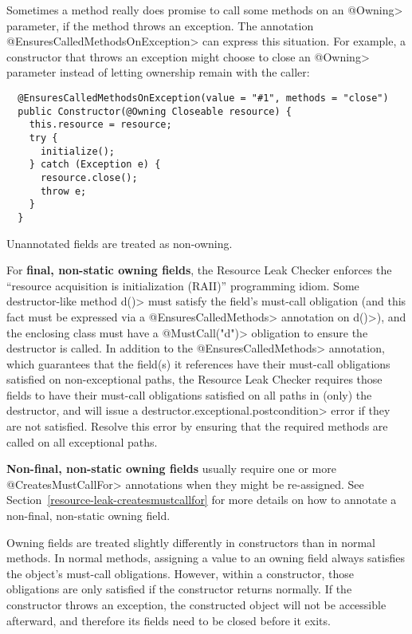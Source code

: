 Sometimes a method really does promise to call some methods on an \<@Owning> parameter,
if the method throws an exception.  The annotation \<@EnsuresCalledMethodsOnException> can
express this situation.  For example, a constructor that throws an exception might
choose to close an \<@Owning> parameter instead of letting ownership remain with the caller:

\begin{verbatim}
  @EnsuresCalledMethodsOnException(value = "#1", methods = "close")
  public Constructor(@Owning Closeable resource) {
    this.resource = resource;
    try {
      initialize();
    } catch (Exception e) {
      resource.close();
      throw e;
    }
  }
\end{verbatim}


Unannotated fields are treated as non-owning.

For \textbf{final, non-static owning fields},
the Resource Leak Checker enforces the ``resource acquisition is
initialization (RAII)'' programming idiom.  Some
destructor-like method \<d()> must satisfy the field's must-call obligation
(and this fact must be expressed via a \<@EnsuresCalledMethods> annotation on \<d()>),
and the enclosing class must have a \<@MustCall("d")> obligation to
ensure the destructor is called. In addition to the \<@EnsuresCalledMethods> annotation,
which guarantees that the field(s) it references have their must-call obligations satisfied
on non-exceptional paths, the Resource Leak Checker requires those fields to have their must-call
obligations satisfied on all paths in (only) the destructor, and will issue a \<destructor.exceptional.postcondition>
error if they are not satisfied. Resolve this error by ensuring that the required methods are called
on all exceptional paths.

\textbf{Non-final, non-static owning fields} usually require one or more \<@CreatesMustCallFor> annotations
when they might be re-assigned. See Section~\ref{resource-leak-createsmustcallfor} for
more details on how to annotate a non-final, non-static owning field.

Owning fields are treated slightly differently in constructors than in normal methods.
In normal methods, assigning a value to an owning field always satisfies the object's
must-call obligations.  However, within a constructor, those obligations are only
satisfied if the constructor returns normally.  If the constructor throws an exception,
the constructed object will not be accessible afterward, and therefore its fields need
to be closed before it exits.

